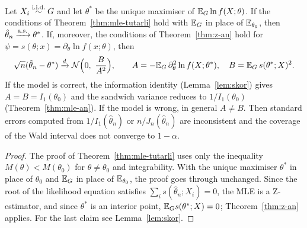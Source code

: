 \documentclass[main.tex]{subfiles}
\begin{document}
\begin{corollary}\label{cor:mle-yanlis}
Let $X_i\overset{\text{i.i.d.}}{\sim} G$ and let $\theta^*$ be the unique maximiser of $\mathbb{E}_G\ln f(X;\theta)$. If the conditions of Theorem~\ref{thm:mle-tutarli} hold with $\mathbb{E}_G$ in place of $\mathbb{E}_{\theta_0}$, then $\hat\theta_n\xrightarrow{\text{a.s.}}\theta^*$. If, moreover, the conditions of Theorem~\ref{thm:z-an} hold for $\psi=s(\theta;x)=\partial_\theta\ln f(x;\theta)$, then
\[
\sqrt n(\hat\theta_n-\theta^*)\xrightarrow{d}\mathcal{N}\Big(0,\ \frac{B}{A^2}\Big),\qquad A=-\mathbb{E}_G\,\partial^2_\theta\ln f(X;\theta^*),\quad B=\mathbb{E}_G\,s(\theta^*;X)^2 .
\]
If the model is correct, the information identity (Lemma~\ref{lem:skor}) gives $A=B=I_1(\theta_0)$ and the sandwich variance reduces to $1/I_1(\theta_0)$ (Theorem~\ref{thm:mle-an}). If the model is wrong, in general $A\ne B$. Then standard errors computed from $1/I_1(\hat\theta_n)$ or $n/J_n(\hat\theta_n)$ are inconsistent and the coverage of the Wald interval does not converge to $1-\alpha$.
\end{corollary}
\begin{proof}
The proof of Theorem~\ref{thm:mle-tutarli} uses only the inequality $M(\theta)<M(\theta_0)$ for $\theta\neq\theta_0$ and integrability. With the unique maximiser $\theta^*$ in place of $\theta_0$ and $\mathbb{E}_G$ in place of $\mathbb{E}_{\theta_0}$, the proof goes through unchanged. Since the root of the likelihood equation satisfies $\sum_is(\hat\theta_n;X_i)=0$, the MLE is a Z-estimator, and since $\theta^*$ is an interior point, $\mathbb{E}_Gs(\theta^*;X)=0$; Theorem~\ref{thm:z-an} applies. For the last claim see Lemma~\ref{lem:skor}.
\end{proof}
\end{document}
